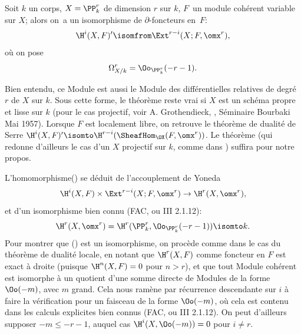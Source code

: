\begin{theoreme} \label{XII.1.1}
Soit $k$ un corps, $X=\PP_k^r$  de dimension $r$ sur $k$, $F$~un module coh\'erent variable sur $X$; alors on~a un isomorphisme de $\partial$-foncteurs en~$F$:
\steco
\begin{equation} \label{eq:XII.1} {}\H^i(X, F)' \isomfrom \Ext^{r-i}(X;F, \omx^r),
\end{equation}
o\`u on pose
\steco
\begin{equation} \label{eq:XII.2} {}\Omega_{X/k}^r= \Oo_{\PP_k^r}(-r-1).
\end{equation}
\end{theoreme}

\begin{remarquestar}
Bien entendu, ce Module est aussi le Module des diff\'erentielles relatives de degr\'e $r$ de $X$ sur $k$. Sous cette forme, le th\'eor\`eme reste vrai si $X$ est un sch\'ema propre et lisse sur $k$ (pour le cas projectif, voir A. Grothendieck, \og {}\fg, S\'eminaire Bourbaki Mai 1957). Lorsque $F$ est localement libre, on retrouve le th\'eor\`eme de dualit\'e de Serre $\H^i(X, F)' \isomto \H^{r-i}(\SheafHom_{\OX}(F, \omx^r))$. Le th\'eor\`eme  (qui redonne d'ailleurs le cas d'un $X$ projectif sur $k$, comme dans {\loccit}) suffira pour notre propos.
\end{remarquestar} L'homomorphisme\pageoriginale () se d\'eduit de l'accouplement de Yoneda
\steco
\begin{equation} \label{eq:XII.3} {}\H^i(X, F) \times \Ext^{r-i}(X;F, \omx^r) \to \H^r(X, \omx^r),
\end{equation}
et d'un isomorphisme bien connu (\cf FAC, ou \EGA III 2.1.12):
\steco
\begin{equation} \label{eq:XII.4} {}\H^r(X, \omx^r) = \H^r(\PP_k^r, \Oo_{\PP_k^r}(-r-1)) \isomto k.
\end{equation}
Pour montrer que () est un isomorphisme, on proc\`ede comme dans le cas du th\'eor\`eme de dualit\'e locale, en notant que $\H^r(X, F)$ comme foncteur en $F$ est exact \`a droite (puisque $\H^n(X, F)=0$ pour $n>r$), et que tout Module coh\'erent est isomorphe \`a un quotient d'une somme directe de Modules de la forme $\Oo(-m)$, avec $m$ grand. Cela nous ram\`ene par r\'ecurrence descendante sur $i$ \`a faire la v\'erification pour un faisceau de la forme $\Oo(-m)$, o\`u cela est contenu dans les calculs explicites bien connus (FAC, ou \EGA III 2.1.12). On peut d'ailleurs supposer $-m \leq -r-1$, auquel cas $\H^i(X, \Oo(-m))=0$ pour $i\neq r$.


